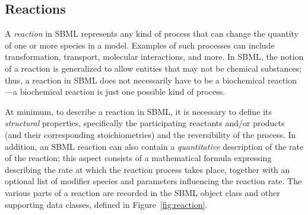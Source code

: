 \subsection{Reactions}
\label{sec:reactions}

A \emph{reaction} in SBML represents any kind of process that can
change the quantity of one or more species in a model.  Examples
of such processes can include transformation, transport, molecular
interactions, and more.  In SBML, the notion of a reaction is
generalized to allow entities that may not be chemical substances;
thus, a reaction in SBML does not necessarily have to be a
biochemical reaction---a biochemical reaction is just one possible
kind of process.

At minimum, to describe a reaction in SBML, it is necessary to
define its \emph{structural} properties, specifically the
participating reactants and/or products (and their corresponding
stoichiometries) and the reversibility of the process.  In
addition, an SBML reaction can also contain a \emph{quantitative}
description of the rate of the reaction; this aspect consists of a
mathematical formula expressing describing the rate at which the
reaction process takes place, together with an optional list of
modifier species and parameters influencing the reaction rate.
The various parts of a reaction are recorded in the SBML \Reaction
object class and other supporting data classes, defined in
Figure~\vref{fig:reaction}.

